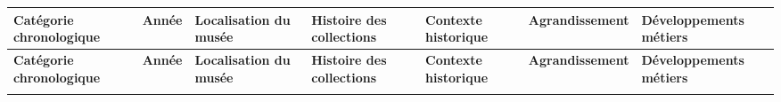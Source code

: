 \begin{longtable}{X[2,l]X[0.8,c]X[1.5,l]X[1.5,l]X[1.5,l]X[1.2,l]X[1.5,l]}
\toprule
\textbf{Catégorie chronologique} & \textbf{Année} & \textbf{Localisation du musée} & \textbf{Histoire des collections} & \textbf{Contexte historique} & \textbf{Agrandissement} & \textbf{Développements métiers} \\
\midrule
\endfirsthead

\toprule
\textbf{Catégorie chronologique} & \textbf{Année} & \textbf{Localisation du musée} & \textbf{Histoire des collections} & \textbf{Contexte historique} & \textbf{Agrandissement} & \textbf{Développements métiers} \\
\midrule
\endhead

\bottomrule
\endfoot

\bottomrule
\endlastfoot


\end{longtable}
